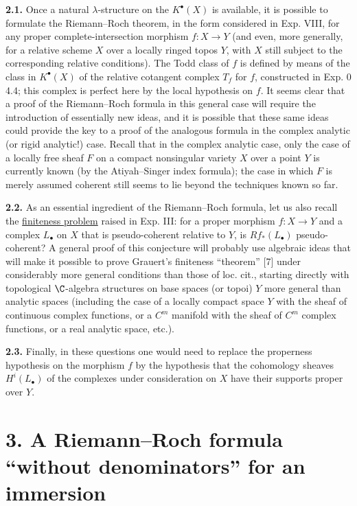 \textbf{2.1.} Once a natural $\lambda$-structure on the $K^\bullet(X)$ is available, it is possible to formulate the Riemann--Roch theorem, in the form considered in Exp. VIII, for any proper complete-intersection morphism $f:X\to Y$ (and even, more generally, for a relative scheme $X$ over a locally ringed topos $Y$, with $X$ still subject to the corresponding relative conditions). The Todd class of $f$ is defined by means of the class in $K^\bullet(X)$ of the relative cotangent complex $T_f$ for $f$, constructed in Exp. 0 4.4; this complex is perfect here by the local hypothesis on $f$. It seems clear that a proof of the Riemann--Roch formula in this general case will require the introduction of essentially new ideas, and it is possible that these same ideas could provide the key
%
to a proof of the analogous formula in the complex analytic (or rigid analytic!) case. Recall that in the complex analytic case, only the case of a locally free sheaf $F$ on a compact nonsingular variety $X$ over a point $Y$ is currently known (by the Atiyah--Singer index formula); the case in which $F$ is merely assumed coherent still seems to lie beyond the techniques known so far.

\textbf{2.2.} As an essential ingredient of the Riemann--Roch formula, let us also recall the \uline{finiteness problem} raised in Exp. III: for a proper morphism $f:X\to Y$ and a complex $L_\bullet$ on $X$ that is pseudo-coherent relative to $Y$, is $Rf_*(L_\bullet)$ pseudo-coherent? A general proof of this conjecture will probably use algebraic ideas that will make it possible to prove Grauert's finiteness ``theorem'' [7] under considerably more general conditions than those of loc. cit., starting directly with topological $\C$-algebra structures on base spaces (or topoi) $Y$ more general than analytic spaces (including the case of a locally compact space $Y$ with the sheaf of continuous complex functions, or a $C^m$ manifold with the sheaf of $C^m$ complex functions, or a real analytic space, etc.).

\textbf{2.3.} Finally, in these questions one would need to replace the properness hypothesis on the morphism $f$ by the hypothesis that the cohomology sheaves $H^i(L_\bullet)$ of the complexes under consideration on $X$ have their supports proper over $Y$.

\section*{3. A Riemann--Roch formula ``without denominators'' for an immersion}

